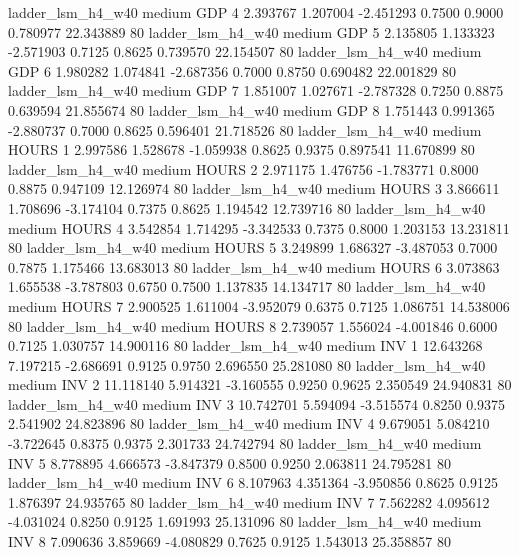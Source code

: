      ladder_lsm_h4_w40     medium      GDP                 4  2.393767 1.207004 -2.451293 0.7500 0.9000  0.780977   22.343889 80
     ladder_lsm_h4_w40     medium      GDP                 5  2.135805 1.133323 -2.571903 0.7125 0.8625  0.739570   22.154507 80
     ladder_lsm_h4_w40     medium      GDP                 6  1.980282 1.074841 -2.687356 0.7000 0.8750  0.690482   22.001829 80
     ladder_lsm_h4_w40     medium      GDP                 7  1.851007 1.027671 -2.787328 0.7250 0.8875  0.639594   21.855674 80
     ladder_lsm_h4_w40     medium      GDP                 8  1.751443 0.991365 -2.880737 0.7000 0.8625  0.596401   21.718526 80
     ladder_lsm_h4_w40     medium    HOURS                 1  2.997586 1.528678 -1.059938 0.8625 0.9375  0.897541   11.670899 80
     ladder_lsm_h4_w40     medium    HOURS                 2  2.971175 1.476756 -1.783771 0.8000 0.8875  0.947109   12.126974 80
     ladder_lsm_h4_w40     medium    HOURS                 3  3.866611 1.708696 -3.174104 0.7375 0.8625  1.194542   12.739716 80
     ladder_lsm_h4_w40     medium    HOURS                 4  3.542854 1.714295 -3.342533 0.7375 0.8000  1.203153   13.231811 80
     ladder_lsm_h4_w40     medium    HOURS                 5  3.249899 1.686327 -3.487053 0.7000 0.7875  1.175466   13.683013 80
     ladder_lsm_h4_w40     medium    HOURS                 6  3.073863 1.655538 -3.787803 0.6750 0.7500  1.137835   14.134717 80
     ladder_lsm_h4_w40     medium    HOURS                 7  2.900525 1.611004 -3.952079 0.6375 0.7125  1.086751   14.538006 80
     ladder_lsm_h4_w40     medium    HOURS                 8  2.739057 1.556024 -4.001846 0.6000 0.7125  1.030757   14.900116 80
     ladder_lsm_h4_w40     medium      INV                 1 12.643268 7.197215 -2.686691 0.9125 0.9750  2.696550   25.281080 80
     ladder_lsm_h4_w40     medium      INV                 2 11.118140 5.914321 -3.160555 0.9250 0.9625  2.350549   24.940831 80
     ladder_lsm_h4_w40     medium      INV                 3 10.742701 5.594094 -3.515574 0.8250 0.9375  2.541902   24.823896 80
     ladder_lsm_h4_w40     medium      INV                 4  9.679051 5.084210 -3.722645 0.8375 0.9375  2.301733   24.742794 80
     ladder_lsm_h4_w40     medium      INV                 5  8.778895 4.666573 -3.847379 0.8500 0.9250  2.063811   24.795281 80
     ladder_lsm_h4_w40     medium      INV                 6  8.107963 4.351364 -3.950856 0.8625 0.9125  1.876397   24.935765 80
     ladder_lsm_h4_w40     medium      INV                 7  7.562282 4.095612 -4.031024 0.8250 0.9125  1.691993   25.131096 80
     ladder_lsm_h4_w40     medium      INV                 8  7.090636 3.859669 -4.080829 0.7625 0.9125  1.543013   25.358857 80
